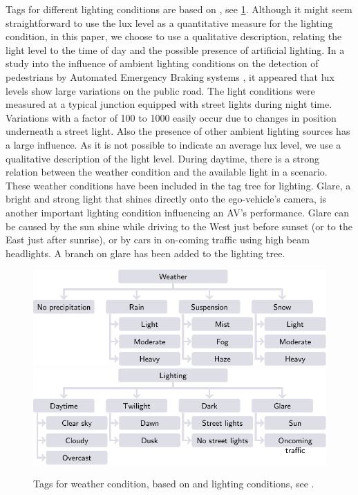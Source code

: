 Tags for different lighting conditions are based on \cite{golob2003relationships}, see \cref{fig:conditions}. Although it might seem straightforward to use the lux level as a quantitative measure for the lighting condition, in this paper, we choose to use a qualitative description, relating the light level to the time of day and the possible presence of artificial lighting. In a study into the influence of ambient lighting conditions on the detection of pedestrians by Automated Emergency Braking systems \autocite{wouters2013influence}, it appeared that lux levels show large variations on the public road. 
The light conditions were measured at a typical junction equipped with street lights during night time. Variations with a factor of 100 to 1000 easily occur due to changes in position underneath a street light. 
Also the presence of other ambient lighting sources has a large influence. As it is not possible to indicate an average lux level, we use a qualitative description of the light level. 
During daytime, there is a strong relation between the weather condition and the available light in a scenario. These weather conditions have been included in the tag tree for lighting.
Glare, a bright and strong light that shines directly onto the ego-vehicle's camera, is another important lighting condition influencing an AV's performance. Glare can be caused by the sun shine while driving to the West just before sunset (or to the East just after sunrise), or by cars in on-coming traffic using high beam headlights. A branch on glare has been added to the lighting tree.  

\begin{figure}[t]
	\centering
	\includegraphics{figures/weather}\\
	\vspace{0.5em}
	\includegraphics{figures/lighting}
	\caption{Tags for weather condition, based on \cite{mahmassani2012use} and lighting conditions, see \cite{golob2003relationships}.}
	\label{fig:conditions}
\end{figure}
